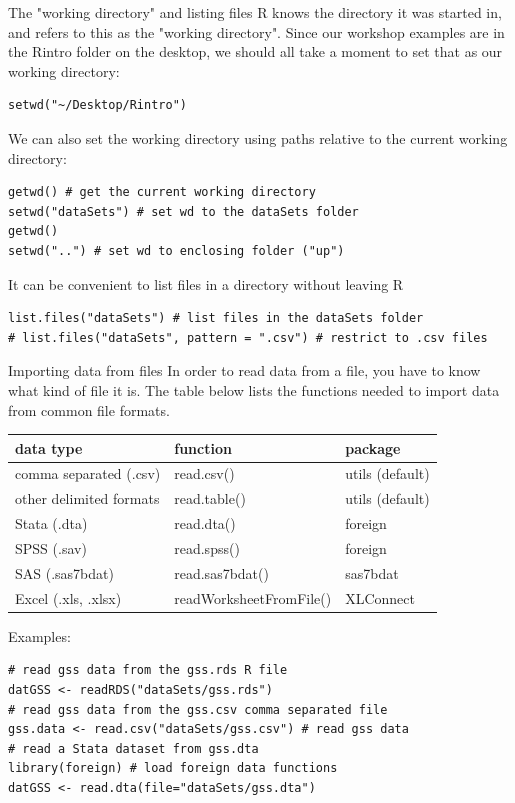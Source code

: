 \documentclass[table,smaller]{beamer}
\begin{document}
\begin{frame}[fragile,label=sec-5-2]{The "working directory" and listing files}
 R knows the directory it was started in, and refers to this as the "working directory". Since our workshop examples are in the Rintro folder on the desktop, we should all take a moment to set that as our working directory:
\begin{verbatim}
setwd("~/Desktop/Rintro")
\end{verbatim}

We can also set the working directory using paths relative to the current working directory:

\begin{verbatim}
getwd() # get the current working directory
setwd("dataSets") # set wd to the dataSets folder
getwd()
setwd("..") # set wd to enclosing folder ("up")
\end{verbatim}

It can be convenient to list files in a directory without leaving R
\begin{verbatim}
list.files("dataSets") # list files in the dataSets folder
# list.files("dataSets", pattern = ".csv") # restrict to .csv files
\end{verbatim}
\end{frame}


\begin{frame}[fragile,label=sec-5-3]{Importing data from files}
 In order to read data from a file, you have to know what kind of file it is. The table below lists the functions needed to import data from common file formats.

\begin{center}
\begin{tabular}{lll}
data type & function & package\\
\hline
comma separated (.csv) & read.csv() & utils (default)\\
other delimited formats & read.table() & utils (default)\\
Stata (.dta) & read.dta() & foreign\\
SPSS (.sav) & read.spss() & foreign\\
SAS (.sas7bdat) & read.sas7bdat() & sas7bdat\\
Excel (.xls, .xlsx) & readWorksheetFromFile() & XLConnect\\
\hline
\end{tabular}
\end{center}

Examples:
\begin{verbatim}
# read gss data from the gss.rds R file
datGSS <- readRDS("dataSets/gss.rds")
# read gss data from the gss.csv comma separated file
gss.data <- read.csv("dataSets/gss.csv") # read gss data
# read a Stata dataset from gss.dta 
library(foreign) # load foreign data functions
datGSS <- read.dta(file="dataSets/gss.dta")
\end{verbatim}
\end{frame}
\end{document}
